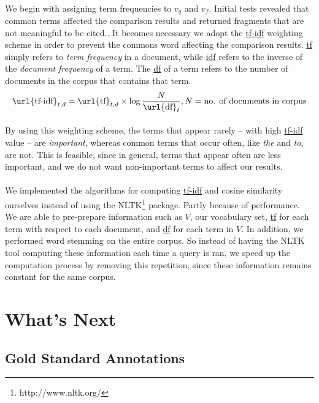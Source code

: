 \documentclass[12 pt]{article}
\begin{document}
\paragraph{}
We begin with assigning term frequencies to $v_q$ and $v_f$. Initial tests revealed that common terms affected the comparison results and returned fragments that are not meaningful to be cited.. It becomes necessary we adopt the \url{tf-idf} weighting scheme in order to prevent the commons word affecting the comparison results. \url{tf} simply refers to \textit{term frequency} in a document, while \url{idf} refers to the inverse of the \textit{document frequency} of a term. The \url{df} of a term refers to the number of documents in the corpus that contains that term.
\begin{equation}
\text{\url{tf-idf}}_{t,d} = \text{\url{tf}}_{t,d} \times \log{\frac{N}{\text{\url{df}}_t}}, N=\text{no. of documents in corpus}
\end{equation}
\paragraph{}
By using this weighting scheme, the terms that appear rarely -- with high \url{tf-idf} value -- are \textit{important}, whereas common terms that occur often, like \textit{the} and \textit{to}, are not. This is feasible, since in general, terms that appear often are less important, and we do not want non-important terms to affect our results.

\paragraph{}
We implemented the algorithms for computing \url{tf-idf} and cosine similarity ourselves instead of using the NLTK\footnote{http://www.nltk.org/} package. Partly because of performance. We are able to pre-prepare information such as $V$, our vocabulary set, \url{tf} for each term with respect to each document, and \url{df} for each term in $V$. In addition, we performed word stemming on the entire corpus. So instead of having the NLTK tool computing these information each time a query is ran, we speed up the computation process by removing this repetition, since these information remains constant for the same corpus.

\section{What's Next}
\label{whatsnext}
\subsection{Gold Standard Annotations}
\end{document}
